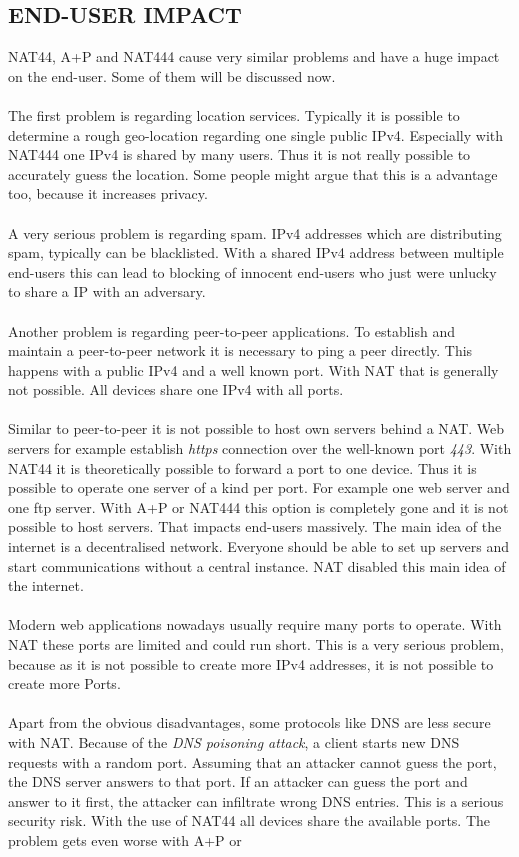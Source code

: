 \documentclass[format=sigconf, natbib=true, nonacm=true]{acmart}
\begin{document}
    \subsection*{END-USER IMPACT}
    NAT44, A+P and NAT444 cause very similar problems and have a huge impact on the end-user. Some of them will be discussed now.\\\\The first problem is regarding location services. Typically it is possible to determine a rough geo-location regarding one single public IPv4. Especially with NAT444 one IPv4 is shared by many users. Thus it is not really possible to accurately guess the location. Some people might argue that this is a advantage too, because it increases privacy\cite{Hughes2022_C04}.\\\\A very serious problem is regarding spam. IPv4 addresses which are distributing spam, typically can be blacklisted. With a shared IPv4 address between multiple end-users this can lead to blocking of innocent end-users who just were unlucky to share a IP with an adversary\cite{Hughes2022_C04}.\\\\Another problem is regarding peer-to-peer applications. To establish and maintain a peer-to-peer network it is necessary to ping a peer directly. This happens with a public IPv4 and a well known port. With NAT that is generally not possible. All devices share one IPv4 with all ports\cite{Hughes2022_C04}.\\\\Similar to peer-to-peer it is not possible to host own servers behind a NAT. Web servers for example establish \textit{https} connection over the well-known port \textit{443}. With NAT44 it is theoretically possible to forward a port to one device. Thus it is possible to operate one server of a kind per port. For example one web server and one ftp server. With A+P or NAT444 this option is completely gone and it is not possible to host servers. That impacts end-users massively. The main idea of the internet is a decentralised network. Everyone should be able to set up servers and start communications without a central instance. NAT disabled this main idea of the internet\cite{Hughes2022_C04}.\\\\Modern web applications nowadays usually require many ports to operate. With NAT these ports are limited and could run short. This is a very serious problem, because as it is not possible to create more IPv4 addresses, it is not possible to create more Ports\cite{Hughes2022_C04}.\\\\Apart from the obvious disadvantages, some protocols like DNS are less secure with NAT. Because of the \textit{DNS poisoning attack}, a client starts new DNS requests with a random port. Assuming that an attacker cannot guess the port, the DNS server answers to that port. If an attacker can guess the port and answer to it first, the attacker can infiltrate wrong DNS entries. This is a serious security risk. With the use of NAT44 all devices share the available ports. The problem gets even worse with A+P or 
\end{document}
